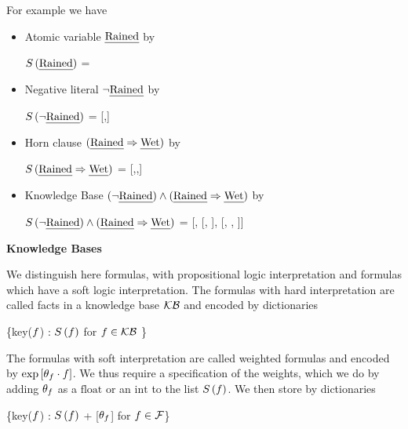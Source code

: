 \begin{example}
    For example we have
    \begin{itemize}
        \item
        Atomic variable $\text{\emph{Rained}}$ by
        \begin{centeredscript}
            $S\left(\text{\emph{Rained}}\right)$
			= 
        \end{centeredscript}
        \item
        Negative literal $\lnot\text{\emph{Rained}}$ by
        \begin{centeredscript}
            $S\left(\lnot\text{\emph{Rained}}\right)$
			= [,]
        \end{centeredscript}
        \item
        Horn clause $\left(\text{\emph{Rained}}\Rightarrow\text{\emph{Wet}}\right)$ by
        \begin{centeredscript}
            $S\left(\text{\emph{Rained}}\Rightarrow\text{\emph{Wet}}\right)$
			= [,,]
        \end{centeredscript}
        \item
        Knowledge Base
        $(\lnot\text{\emph{Rained}})\land(\text{\emph{Rained}}\Rightarrow\text{\emph{Wet}})$ by
        \begin{centeredscript}
            $S\left(\lnot\text{\emph{Rained}})\land(\text{\emph{Rained}}\Rightarrow\text{\emph{Wet}}\right)$
			=  [, [, ], [, , ]]
        \end{centeredscript}
    \end{itemize}
\end{example}




\textbf{Knowledge Bases}

We distinguish here formulas, with propositional logic interpretation and formulas which have a soft logic interpretation.
The formulas with hard interpretation are called facts in a knowledge base $\mathcal{KB}$ and encoded by dictionaries
\begin{centeredscript}
    \{key($f$) : $S\left(f\right)$ for $f\in\mathcal{KB}$ \}
\end{centeredscript}

\textbf{\MarkovLogicNetworks{}}

The formulas with soft interpretation are called weighted formulas and encoded by $\mathrm{exp}\left[\theta_{f}\cdot f\right]$.
We thus require a specification of the weights, which we do by adding $\theta_{f}$ as a $\mathrm{float}$ or an $\mathrm{int}$ to the list $S\left(f\right)$.
We then store \MarkovLogicNetworks{} by dictionaries
\begin{centeredscript}
    \{key($f$) : $S\left(f\right)$ + [$\theta_{f}$] for $f\in\mathcal{F}$\}
\end{centeredscript}

